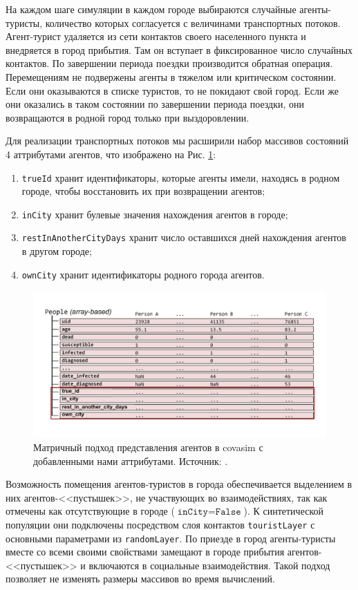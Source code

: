 \documentclass[a4paper,12pt]{article} %
\begin{document}
На каждом шаге симуляции в каждом городе выбираются случайные агенты-туристы, количество которых согласуется с величинами транспортных потоков. Агент-турист удаляется из сети контактов своего населенного пункта и внедряется в город прибытия. Там он вступает в фиксированное число случайных контактов. По завершении периода поездки производится обратная операция. Перемещениям не подвержены агенты в тяжелом или критическом состоянии. Если они оказываются в списке туристов, то не покидают свой город. Если же они оказались в таком состоянии по завершении периода поездки, они возвращаются в родной город только при выздоровлении.

Для реализации транспортных потоков мы расширили набор массивов состояний 4 аттрибутами агентов, что изображено на Рис. \ref{pic:array}:
\begin{enumerate}
\item \texttt{trueId} хранит идентификаторы, которые агенты имели, находясь в родном городе, чтобы восстановить их при возвращении агентов;
\item \texttt{inCity} хранит булевые значения нахождения агентов в городе;
\item \texttt{restInAnotherCityDays} хранит число оставшихся дней нахождения агентов в другом городе;
\item \texttt{ownCity} хранит идентификаторы родного города агентов.
\end{enumerate}

\begin{figure}[]
    \centering
    \includegraphics[width=0.8\linewidth]{images/arrays.pdf}
    \caption{Матричный подход представления агентов в \gls{covasim} с добавленными нами аттрибутами. Источник: \cite{kerr2021covasim}.}
    \label{pic:array}
\end{figure}

Возможность помещения агентов-туристов в города обеспечивается выделением в них агентов-<<пустышек>>, не участвующих во взаимодействиях, так как отмечены как отсутствующие в городе (\(\texttt{inCity} = \texttt{False}\)). К синтетической популяции они подключены посредством слоя контактов \texttt{touristLayer} с основными параметрами из \texttt{randomLayer}. По приезде в город агенты-туристы вместе со всеми своими свойствами замещают в городе прибытия агентов-<<пустышек>> и включаются в социальные взаимодействия. Такой подход позволяет не изменять размеры массивов во время вычислений.
\end{document}
